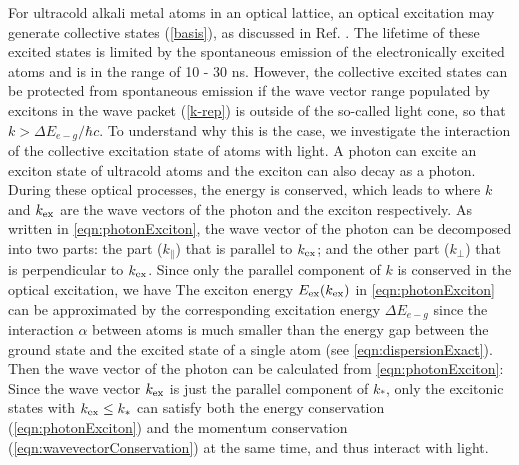 For ultracold alkali metal atoms in an optical lattice, an optical excitation may generate collective states (\ref{basis}),
as discussed in Ref. \cite{electronic-exciton1, electronic-exciton2}. The lifetime of these excited states is limited by the spontaneous emission of the electronically excited atoms and is
in the range of 10 - 30 ns.
However, the collective excited states can be protected from spontaneous emission if the wave vector range populated by excitons in the wave packet (\ref{k-rep}) is
outside of the so-called light cone, so that $k >\Delta E_{e-g}/\hbar c$.  To understand why this is the case, we 
investigate the interaction of the collective excitation state of atoms with light. A photon can excite an exciton
 state of ultracold atoms and the exciton can also decay as a photon. 
During these optical processes,  the energy is conserved, which leads to 
where $k$ and $k_{\rm ex}$ are the wave vectors of the photon and the exciton respectively. As written in
 \autoref{eqn:photonExciton}, the wave vector of the photon can be decomposed into two parts: the part 
($k_{\parallel}$) that is parallel to $k_{\rm ex}$; and the other part ($k_{\perp}$) that is perpendicular to
 $k_{\rm ex}$. Since only the parallel component of $k$ is conserved in the optical excitation, we have
The exciton energy $E_{\rm ex}(k_{\rm ex})$ in \autoref{eqn:photonExciton} can be approximated by the
 corresponding excitation energy $ \Delta E_{e-g}$ since the interaction $\alpha$ between atoms is much smaller
 than the energy gap between the ground state and the excited state of a single atom 
(see \autoref{eqn:dispersionExact}). Then the wave vector of the photon can be calculated from \autoref{eqn:photonExciton}:
Since the wave vector $k_{\rm ex}$ is just the parallel component of $k_{*}$, only the excitonic states with 
$k_{\rm ex} \leq k_*$  can satisfy both the energy conservation (\autoref{eqn:photonExciton}) and the momentum
 conservation (\autoref{eqn:wavevectorConservation}) at the same time, and thus interact with light. 
